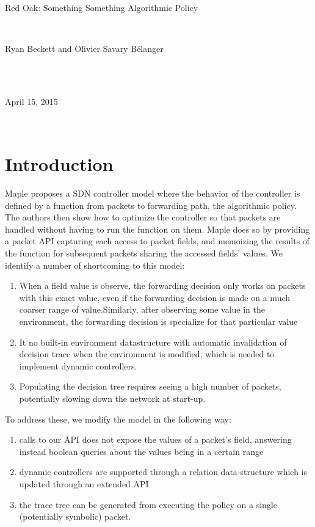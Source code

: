 \documentclass[12pt]{article}
\begin{document}
\quad \\
\quad \\
\quad \\
\centerline{ \large{Red Oak: Something Something Algorithmic Policy}}
\vspace{1pt}\\
\centerline{Ryan Beckett and Olivier Savary B\'{e}langer} \\
\\
\centerline{April 15, 2015} \\


\section*{Introduction}

Maple \cite{Maple} proposes a SDN controller model where the behavior of the controller is defined by a function from packets to forwarding path, the algorithmic policy. The authors then show how to optimize the controller so that packets are handled without having to run the function on them. Maple does so by providing a packet API capturing each access to packet fields, and memoizing the results of the function for subsequent packets sharing the accessed fields' values. We identify a number of shortcoming to this model:
\begin{enumerate}
\item When a field value is observe, the forwarding decision only works on packets with this exact value, even if the forwarding decision is made on a much coarser range of value.Similarly, after observing some value in the environment, the forwarding decision is specialize for that particular value
  
\item It no built-in environment datastructure with automatic invalidation of decision trace when the environment is modified, which is needed to implement dynamic controllers.
  
  \item Populating the decision tree requires seeing a high number of packets, potentially slowing down the network at start-up. 
\end{enumerate}


To address these, we modify the model in the following way:
\begin{enumerate}
  \item calls to our API does not expose the values of a packet's field, answering instead boolean queries about the values being in a certain range
  \item dynamic controllers are supported through a relation data-structure which is updated through an extended API
  \item the trace tree can be generated from executing the policy on a single (potentially symbolic) packet.
\end{enumerate}
\end{document}
